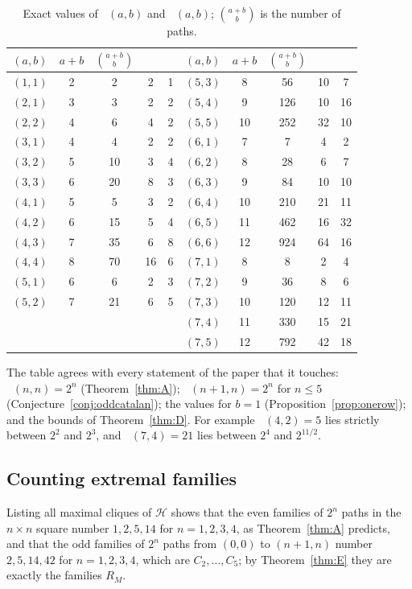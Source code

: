 \documentclass[11pt]{amsart}
\theoremstyle{definition}
\theoremstyle{remark}
\numberwithin{equation}{section}
\DeclareMathOperator{\Meven}{M_{ev}}
\DeclareMathOperator{\Modd}{M_{od}}
\begin{document}
\begin{table}[ht]
\centering
\caption{Exact values of $\Meven(a,b)$ and $\Modd(a,b)$; $\binom{a+b}{b}$ is the number of paths.}
\label{tab:values}
\small
\begin{tabular}{ccccc@{\qquad}ccccc}
\toprule
$(a,b)$ & $a+b$ & $\binom{a+b}{b}$ & $\Meven$ & $\Modd$ & $(a,b)$ & $a+b$ & $\binom{a+b}{b}$ & $\Meven$ & $\Modd$\\
\midrule
$(1,1)$ & 2 & 2 & 2 & 1 & $(5,3)$ & 8 & 56 & 10 & 7 \\
$(2,1)$ & 3 & 3 & 2 & 2 & $(5,4)$ & 9 & 126 & 10 & 16 \\
$(2,2)$ & 4 & 6 & 4 & 2 & $(5,5)$ & 10 & 252 & 32 & 10 \\
$(3,1)$ & 4 & 4 & 2 & 2 & $(6,1)$ & 7 & 7 & 4 & 2 \\
$(3,2)$ & 5 & 10 & 3 & 4 & $(6,2)$ & 8 & 28 & 6 & 7 \\
$(3,3)$ & 6 & 20 & 8 & 3 & $(6,3)$ & 9 & 84 & 10 & 10 \\
$(4,1)$ & 5 & 5 & 3 & 2 & $(6,4)$ & 10 & 210 & 21 & 11 \\
$(4,2)$ & 6 & 15 & 5 & 4 & $(6,5)$ & 11 & 462 & 16 & 32 \\
$(4,3)$ & 7 & 35 & 6 & 8 & $(6,6)$ & 12 & 924 & 64 & 16 \\
$(4,4)$ & 8 & 70 & 16 & 6 & $(7,1)$ & 8 & 8 & 2 & 4 \\
$(5,1)$ & 6 & 6 & 2 & 3 & $(7,2)$ & 9 & 36 & 8 & 6 \\
$(5,2)$ & 7 & 21 & 6 & 5 & $(7,3)$ & 10 & 120 & 12 & 11 \\
 & & & & & $(7,4)$ & 11 & 330 & 15 & 21 \\
 & & & & & $(7,5)$ & 12 & 792 & 42 & 18 \\
\bottomrule
\end{tabular}
\end{table}

The table agrees with every statement of the paper that it touches: $\Meven(n,n)=2^n$ (Theorem~\ref{thm:A}); $\Modd(n+1,n)=2^n$ for $n\le5$ (Conjecture~\ref{conj:oddcatalan}); the values for $b=1$ (Proposition~\ref{prop:onerow}); and the bounds of Theorem~\ref{thm:D}. For example $\Meven(4,2)=5$ lies strictly between $2^2$ and $2^3$, and $\Modd(7,4)=21$ lies between $2^4$ and $2^{11/2}$.

\subsection*{Counting extremal families}
Listing all maximal cliques of $\mathcal H$ shows that the even families of $2^n$ paths in the $n\times n$ square number $1,2,5,14$ for $n=1,2,3,4$, as Theorem~\ref{thm:A} predicts, and that the odd families of $2^n$ paths from $(0,0)$ to $(n+1,n)$ number $2,5,14,42$ for $n=1,2,3,4$, which are $C_2,\dots,C_5$; by Theorem~\ref{thm:E} they are exactly the families $R_M$.
\end{document}

